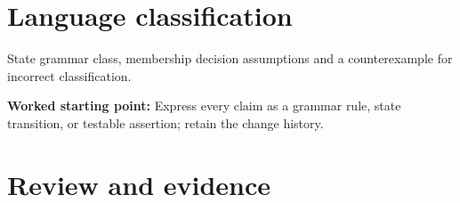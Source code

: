 \documentclass[11pt,letterpaper]{article}
\begin{document}
\section{Language classification}
State grammar class, membership decision assumptions and a counterexample for incorrect classification.\par\textbf{Worked starting point:} Express every claim as a grammar rule, state transition, or testable assertion; retain the change history.
\section{Review and evidence}
\end{document}
